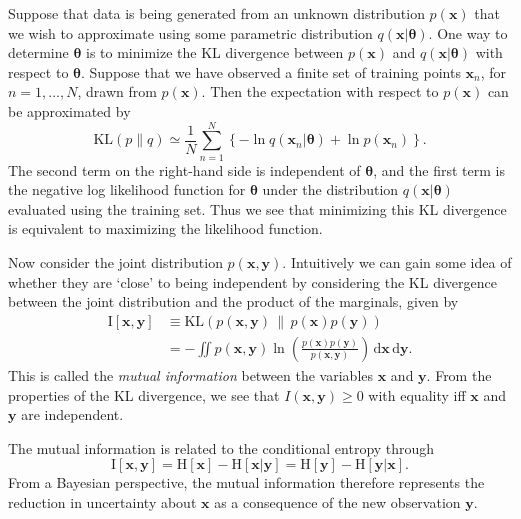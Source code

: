 Suppose that data is being generated from an unknown distribution \( p(\mathbf{x}) \) that we wish to approximate using some parametric distribution \( q(\mathbf{x} |\mathbf{\theta}) \). One way to determine \( \mathbf{\theta} \) is to minimize the KL divergence between \( p(\mathbf{x}) \) and \( q(\mathbf{x} | \mathbf{\theta}) \) with respect to \( \mathbf{\theta} \). Suppose that we have observed a finite set of training points \( \mathbf{x}_n \), for \( n = 1, \ldots, N \), drawn from \( p(\mathbf{x}) \). Then the expectation with respect to \( p(\mathbf{x}) \) can be approximated by
\begin{equation*}
  \mathrm{KL}(p \| q) \simeq \frac{1}{N}\sum_{n=1}^{N} \left\{ -\ln q(\mathbf{x}_n | \mathbf{\theta}) + \ln p(\mathbf{x}_n) \right\}.
\end{equation*}
The second term on the right-hand side is independent of \( \mathbf{\theta} \), and the first term is the negative log likelihood function for \( \mathbf{\theta} \) under the distribution \( q(\mathbf{x} | \mathbf{\theta}) \) evaluated using the training set. Thus we see that minimizing this KL divergence is equivalent to maximizing the likelihood function.

Now consider the joint distribution \( p(\mathbf{x}, \mathbf{y}) \). Intuitively we can gain some idea of whether they are ‘close’ to being independent by considering the KL divergence between the joint distribution and the product of the marginals, given by
\begin{align*}
  \mathrm{I}[\mathbf{x}, \mathbf{y}] &
  \equiv \mathrm{KL}\left(p(\mathbf{x}, \mathbf{y}) \,\|\, p(\mathbf{x})p(\mathbf{y}) \right) \nonumber \\&
  = - \iint p(\mathbf{x}, \mathbf{y}) \ln \left( \frac{p(\mathbf{x})p(\mathbf{y})}{p(\mathbf{x}, \mathbf{y})} \right) \, \mathrm{d}\mathbf{x} \, \mathrm{d}\mathbf{y}.
\end{align*}
This is called the \textit{mutual information} between the variables \( \mathbf{x} \) and \( \mathbf{y} \). From the properties of the KL divergence, we see that \( I(\mathbf{x}, \mathbf{y}) \geq 0 \) with equality iff \( \mathbf{x} \) and \( \mathbf{y} \) are independent.

The mutual information is related to the conditional entropy through
\begin{equation*}
  \mathrm{I}[\mathbf{x}, \mathbf{y}] = \mathrm{H}[\mathbf{x}] - \mathrm{H}[\mathbf{x} | \mathbf{y}] = \mathrm{H}[\mathbf{y}] - \mathrm{H}[\mathbf{y} | \mathbf{x}].
\end{equation*}
From a Bayesian perspective, the mutual information therefore represents the reduction in uncertainty about $\mathbf{x}$ as a consequence of the new observation $\mathbf{y}$.

